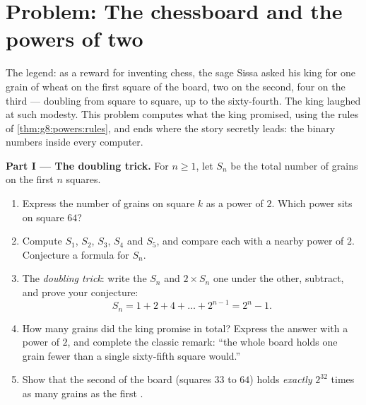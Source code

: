 \section{Problem: The chessboard and the powers of two}

\begin{problem}[{Weekend problem --- the geometric \omterm{def:g1:addition:def}{sum}
$1 + 2 + 4 + \dots + 2^{n-1} = 2^n - 1$, from a famous legend to
binary numbers}]
\label{pb:g8:powers:1}
The legend: as a reward for inventing chess, the sage Sissa asked
his king for one grain of wheat on the first square of the board,
two on the second, four on the third --- doubling from square to
square, up to the sixty-fourth. The king laughed at such modesty.
This problem computes what the king promised, using the 
rules of \cref{thm:g8:powers:rules}, and ends where the story
secretly leads: the binary numbers inside every computer.

\medskip
\noindent\textbf{Part I --- The doubling trick.}
For $n \geq 1$, let $S_n$ be the total number of grains on the
first $n$ squares.
\begin{enumerate}
  \item Express the number of grains on square $k$ as a power of
        $2$. Which power sits on square $64$?
  \item Compute $S_1$, $S_2$, $S_3$, $S_4$ and $S_5$, and compare
        each with a nearby power of $2$. Conjecture a formula for
        $S_n$.
  \item The \emph{doubling trick}: write the  $S_n$ and
        $2 \times S_n$ one under the other, subtract, and prove
        your conjecture:
        \[
        S_n = 1 + 2 + 4 + \dots + 2^{n-1} = 2^n - 1 .
        \]
  \item How many grains did the king promise in total? Express the
        answer with a power of $2$, and complete the classic
        remark: ``the whole board holds one grain fewer than
        a single sixty-fifth square would.''
  \item Show that the second  of the board (squares $33$ to
        $64$) holds \emph{exactly} $2^{32}$ times as many grains
        as the first .
\end{enumerate}


\end{problem}
